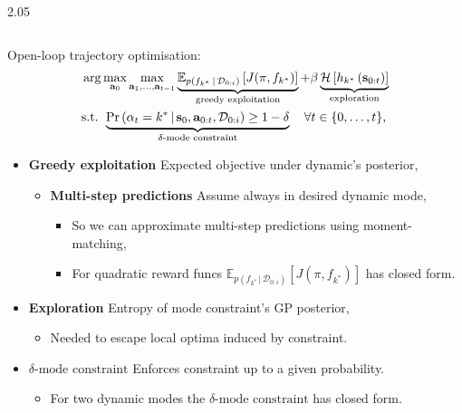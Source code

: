 \documentclass[final,11pt]{beamer}
\newlength{\colwidth}
\newcommand{\E}{\mathbb{E}}    %
\renewcommand{\mid}{\,|\,}
\DeclareMathOperator{\E}{\mathbb{E}}
\newcommand{\modeInd}{\ensuremath{k}}
\newcommand{\modeDesInd}{\ensuremath{\text{des}}}
\newcommand{\modeDes}[1]{\ensuremath{#1^{\modeDesInd}}}
\newcommand{\state}{\ensuremath{\mathbf{x}}}
\newcommand{\control}{\ensuremath{\mathbf{u}}}
\newcommand{\dataset}{\ensuremath{\mathcal{D}}}
\newcommand{\modeVar}{\ensuremath{\alpha}}
\newcommand{\gatingFunc}{\ensuremath{h}}
\newcommand{\timeInd}{\ensuremath{t}}
\newcommand{\TimeInd}{\ensuremath{\MakeUppercase{\timeInd}}}
\newcommand{\dynamicsFunc}{\ensuremath{f}}
\newcommand{\stateTraj}{\ensuremath{\bar{\state}}}
\newcommand{\desiredMode}{\ensuremath{\modeInd^{*}}}
\renewcommand{\modeDes}[1]{\ensuremath{#1_{\desiredMode}}}
\newcommand{\desiredGatingFunction}{\ensuremath{\modeDes{\gatingFunc}}}
\renewcommand{\state}{\ensuremath{\mathbf{s}}}
\renewcommand{\dataset}{\ensuremath{\mathcal{D}}}
\renewcommand{\control}{\ensuremath{\mathbf{a}}}
\newcommand{\action}{\ensuremath{\control}}
\renewcommand{\action}{\ensuremath{\mathbf{a}}}
\begin{document}
\begin{frame}[t]
\begin{columns}[t]
\begin{column}{2.05\colwidth}
\begin{columns}[t]
\begin{column}{\colwidth}
  Open-loop trajectory optimisation:
  \begin{subequations} \label{eq-trajectory-optimisation}
  \begin{align}
  &\arg\max_{\action_{0}}\max_{\action_{1}, \ldots, \action_{\TimeInd-1}}
  \underbrace{\E_{p(\dynamicsFunc_{\desiredMode} \mid \dataset_{0:i})} \left[ J(\pi, \dynamicsFunc_{\desiredMode}) \right]}_{\text{greedy exploitation}}
  + \beta \underbrace{ \mathcal{H} \left[ \gatingFunc_{\desiredMode} \left( \state_{0:\TimeInd} \right) \right]}_{\text{exploration}} \\
  &\text{s.t. } \underbrace{ \Pr \left(\modeVar_{\timeInd} = \desiredMode \mid \state_{0}, \action_{0:t}, \mathcal{D}_{0:i} \right)
  \geq 1-\delta}_{\delta\text{-mode constraint}} \quad \forall \timeInd \in \{0,\ldots, \TimeInd\}, \label{eq-constraint-approx}
  \end{align}
  \end{subequations}
  \begin{itemize}
  \item \textbf{Greedy exploitation} Expected objective under dynamic's posterior,
    \begin{itemize}
      \item \textbf{Multi-step predictions} Assume always in desired dynamic mode,
        \begin{itemize}
          \item So we can approximate multi-step predictions using moment-matching,
          \item For quadratic reward funcs $\E_{p(\dynamicsFunc_{\desiredMode} \mid \dataset_{0:i})} \left[ J(\pi, \dynamicsFunc_{\desiredMode}) \right]$ has closed form.
        \end{itemize}
    \end{itemize}
  \item \textbf{Exploration} Entropy of mode constraint's GP posterior, %
    \begin{itemize}
      \item Needed to escape local optima induced by constraint.
    \end{itemize}
  \item \textbf{$\delta\text{-mode constraint}$} Enforces constraint up to a given probability.
    \begin{itemize}
      \item For two dynamic modes the $\delta\text{-mode constraint}$ has closed form.
    \end{itemize}
  \end{itemize}


\end{column}
\end{columns}
\end{column}
\end{columns}
\end{frame}
\end{document}
